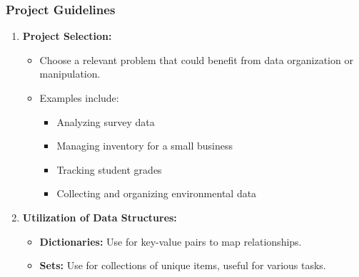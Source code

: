 \documentclass{beamer}
\begin{document}
\begin{frame}
    \frametitle{Project Guidelines}
    \begin{enumerate}
        \item \textbf{Project Selection:}
        \begin{itemize}
            \item Choose a relevant problem that could benefit from data organization or manipulation. 
            \item Examples include:
                \begin{itemize}
                    \item Analyzing survey data
                    \item Managing inventory for a small business
                    \item Tracking student grades
                    \item Collecting and organizing environmental data
                \end{itemize}
        \end{itemize}
        
        \item \textbf{Utilization of Data Structures:}
        \begin{itemize}
            \item \textbf{Dictionaries:} Use for key-value pairs to map relationships. 
            \item \textbf{Sets:} Use for collections of unique items, useful for various tasks.
        \end{itemize}
    \end{enumerate}
\end{frame}
\end{document}
